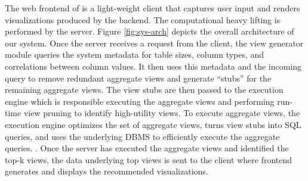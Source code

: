 The web frontend of \SeeDB is a light-weight client that captures user input and renders
visualizations produced by the backend.
The computational heavy lifting is performed by the \SeeDB server.
Figure \ref{fig:sys-arch} depicts the overall architecture of our system.
Once the \SeeDB server receives a request from the client, the view generator module queries the system metadata for table sizes, 
column types, and correlations between column values. 
It then uses this metadata and the incoming query to remove redundant aggregate views and generate ``stubs'' for the remaining aggregate views.
The view stubs are then passed to the execution engine which is responsible 
executing the aggregate views and performing run-time view pruning to identify
high-utility views.
To execute aggregate views, the execution engine optimizes the set of aggregate
views, turns view stubs into SQL queries, and uses the underlying DBMS to efficiently execute the aggregate queries. .
Once the \SeeDB server has executed the aggregate views and identified the top-k
views, the data underlying top views is sent to the client where \SeeDB frontend 
generates and displays the recommended visualizations.






